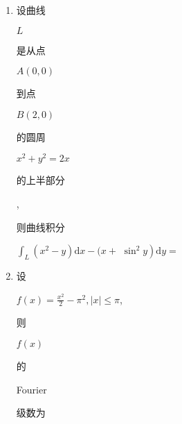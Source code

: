 \documentclass[10pt]{article}
\begin{document}
\begin{enumerate}
  \item \begin{CJK}{UTF8}{mj}设曲线\end{CJK} $L$ \begin{CJK}{UTF8}{mj}是从点\end{CJK} $A(0,0)$ \begin{CJK}{UTF8}{mj}到点\end{CJK} $B(2,0)$ \begin{CJK}{UTF8}{mj}的圆周\end{CJK} $x^{2}+y^{2}=2 x$ \begin{CJK}{UTF8}{mj}的上半部分\end{CJK}, \begin{CJK}{UTF8}{mj}则曲线积分\end{CJK} $\int_{L}\left(x^{2}-y\right) \mathrm{d} x-(x+$ $\left.\sin ^{2} y\right) \mathrm{d} y=$

  \item \begin{CJK}{UTF8}{mj}设\end{CJK} $f(x)=\frac{x^{2}}{2}-\pi^{2},|x| \leqslant \pi$, \begin{CJK}{UTF8}{mj}则\end{CJK} $f(x)$ \begin{CJK}{UTF8}{mj}的\end{CJK} Fourier \begin{CJK}{UTF8}{mj}级数为\end{CJK}

\end{enumerate}
\end{document}
